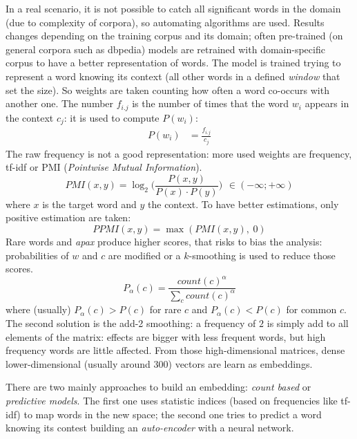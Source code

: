 \documentclass[11pt, a4page]{article}
\begin{document}
In a real scenario, it is not possible to catch all significant words in the domain (due to complexity of corpora), so automating algorithms are used.
Results changes depending on the training corpus and its domain; often pre-trained (on general corpora such as dbpedia) models are retrained with domain-specific corpus to have a better representation of words.
The model is trained trying to represent a word knowing its context (all other words in a defined \textit{window} that set the size).
So weights are taken counting how often a word co-occurs with another one.
The number $f_{i.j}$ is the number of times that the word $w_i$ appears in the context $c_j$: it is used to compute $P(w_i)$:
\begin{align*}
  P(w_i) &= \frac{f_{i.j}}{c_j}
\end{align*}
The raw frequency is not a good representation: more used weights are frequency, tf-idf or PMI (\textit{Pointwise Mutual Information}).
\begin{equation*}
  PMI(x, y) = \log_2 \Big( \frac{P(x, y)}{P(x) \cdot P(y)} \Big) \hspace{5pt} \in (-\infty; +\infty)
\end{equation*}
where $x$ is the target word and $y$ the context.
To have better estimations, only positive estimation are taken:
\begin{equation*}
  PPMI(x, y) = \max(PMI(x, y), \hspace{3pt} 0)
\end{equation*}
Rare words and \textit{apax} produce higher scores, that risks to bias the analysis: probabilities of $w$ and $c$ are modified or a $k$-smoothing is used to reduce those scores.
\begin{equation*}
  P_\alpha(c) = \frac{count(c)^\alpha}{\sum_c count(c)^\alpha}
\end{equation*}
where (usually) $P_\alpha(c) > P(c)$ for rare $c$ and $P_\alpha(c) < P(c)$ for common $c$.
The second solution is the add-2 smoothing: a frequency of $2$ is simply add to all elements of the matrix: effects are bigger with less frequent words, but high frequency words are little affected.
From those high-dimensional matrices, dense lower-dimensional (usually around 300) vectors are learn as embeddings.

There are two mainly approaches to build an embedding: \textit{count based} or \textit{predictive models}.
The first one uses statistic indices (based on frequencies like tf-idf) to map words in the new space; the second one tries to predict a word knowing its contest building an \textit{auto-encoder} with a neural network.
\end{document}
